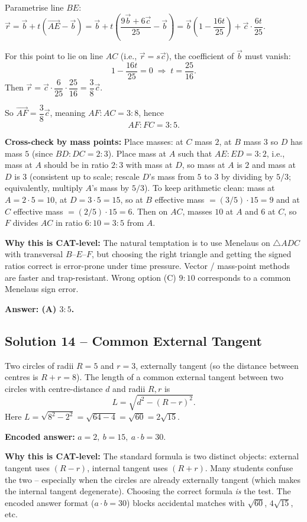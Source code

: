 \documentclass[11pt,a4paper]{article}
\begin{document}
Parametrise line $BE$: $\vec r = \vec b + t(\vec{AE} - \vec b) = \vec b + t\!\left(\dfrac{9\vec b + 6\vec c}{25} - \vec b\right) = \vec b\!\left(1 - \dfrac{16t}{25}\right) + \vec c\cdot\dfrac{6t}{25}.$

For this point to lie on line $AC$ (i.e., $\vec r = s\vec c$), the coefficient of $\vec b$ must vanish:
\[
1 - \dfrac{16t}{25} = 0 \;\Longrightarrow\; t = \dfrac{25}{16}.
\]
Then $\vec r = \vec c\cdot\dfrac{6}{25}\cdot\dfrac{25}{16} = \dfrac{3}{8}\vec c.$

So $\vec{AF} = \dfrac{3}{8}\vec c$, meaning $AF:AC = 3:8$, hence
\[
AF:FC = 3:5.
\]

\textbf{Cross-check by mass points:} Place masses: at $C$ mass $2$, at $B$ mass $3$ so $D$ has mass $5$ (since $BD:DC=2:3$). Place mass at $A$ such that $AE:ED=3:2$, i.e., mass at $A$ should be in ratio $2:3$ with mass at $D$, so mass at $A$ is $2$ and mass at $D$ is $3$ (consistent up to scale; rescale $D$'s mass from $5$ to $3$ by dividing by $5/3$; equivalently, multiply $A$'s mass by $5/3$). To keep arithmetic clean: mass at $A=2\cdot 5 = 10$, at $D = 3\cdot 5 = 15$, so at $B$ effective mass $= (3/5)\cdot 15 = 9$ and at $C$ effective mass $= (2/5)\cdot 15 = 6.$ Then on $AC$, masses $10$ at $A$ and $6$ at $C$, so $F$ divides $AC$ in ratio $6:10 = 3:5$ from $A$. \checkmark

\textbf{Why this is CAT-level:} The natural temptation is to use Menelaus on $\triangle ADC$ with transversal $B$--$E$--$F$, but choosing the right triangle and getting the signed ratios correct is error-prone under time pressure. Vector / mass-point methods are faster and trap-resistant. Wrong option (C) $9:10$ corresponds to a common Menelaus sign error.

\textbf{Answer: (A) $3:5$.}

\medskip

\subsection*{Solution 14 -- Common External Tangent}
Two circles of radii $R=5$ and $r=3$, externally tangent (so the distance between centres is $R+r=8$). The length of a common external tangent between two circles with centre-distance $d$ and radii $R, r$ is
\[
L=\sqrt{d^{2}-(R-r)^{2}}.
\]
Here $L = \sqrt{8^{2} - 2^{2}} = \sqrt{64 - 4} = \sqrt{60} = 2\sqrt{15}.$

\textbf{Encoded answer:} $a=2,\ b=15,\ a\cdot b = 30.$

\textbf{Why this is CAT-level:} The standard formula is two distinct objects: external tangent uses $(R-r)$, internal tangent uses $(R+r)$. Many students confuse the two -- especially when the circles are already externally tangent (which makes the internal tangent degenerate). Choosing the correct formula \emph{is} the test. The encoded answer format ($a\cdot b = 30$) blocks accidental matches with $\sqrt{60}$, $4\sqrt{15}$, etc.
\end{document}
